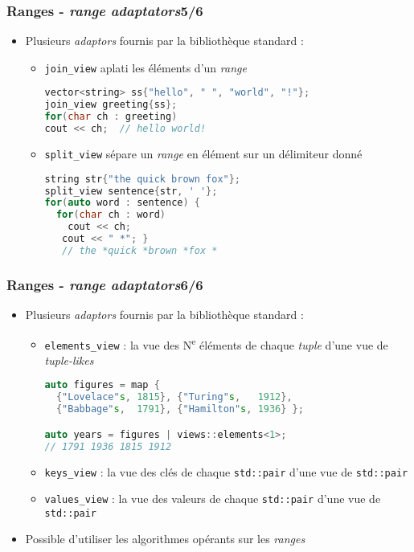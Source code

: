\documentclass[C++.tex]{subfiles}
\begin{document}
\begin{frame}[fragile]
	\frametitle{Ranges - \textit{range adaptators}\titlehfill{}5/6}
	\begin{itemize}
		\item Plusieurs \textit{adaptors} fournis par la bibliothèque standard :
		\begin{itemize}
			\item \lstinline|join_view| \og aplati\fg{} les éléments d'un \textit{range}

\begin{lstlisting}[language=C++]
vector<string> ss{"hello", " ", "world", "!"};
join_view greeting{ss};
for(char ch : greeting)
cout << ch;  // hello world!\end{lstlisting}

			\item \lstinline|split_view| sépare un \textit{range} en élément sur un délimiteur donné
			
			\begin{lstlisting}[language=C++]
string str{"the quick brown fox"};
split_view sentence{str, ' '};
for(auto word : sentence) {
  for(char ch : word)
    cout << ch;
   cout << " *"; }
   // the *quick *brown *fox *\end{lstlisting}
			
		\end{itemize}
	\end{itemize}
\end{frame}

\begin{frame}[fragile]
	\frametitle{Ranges - \textit{range adaptators}\titlehfill{}6/6}
	\begin{itemize}
		\item Plusieurs \textit{adaptors} fournis par la bibliothèque standard :
		\begin{itemize}
			\item \lstinline|elements_view| : la vue des N\textsuperscript{e} éléments de chaque \textit{tuple} d'une vue de \textit{tuple-likes}

			\begin{lstlisting}[language=C++]
auto figures = map {
  {"Lovelace"s, 1815}, {"Turing"s,   1912},
  {"Babbage"s,  1791}, {"Hamilton"s, 1936} };

auto years = figures | views::elements<1>;
// 1791 1936 1815 1912\end{lstlisting}

			\item \lstinline|keys_view| : la vue des clés de chaque \lstinline|std::pair| d'une vue de \lstinline|std::pair|
			\item \lstinline|values_view| : la vue des valeurs de chaque \lstinline|std::pair| d'une vue de \lstinline|std::pair|
		\end{itemize}
	\item Possible d'utiliser les algorithmes opérants sur les \textit{ranges}
	\end{itemize}
\end{frame}
\end{document}
